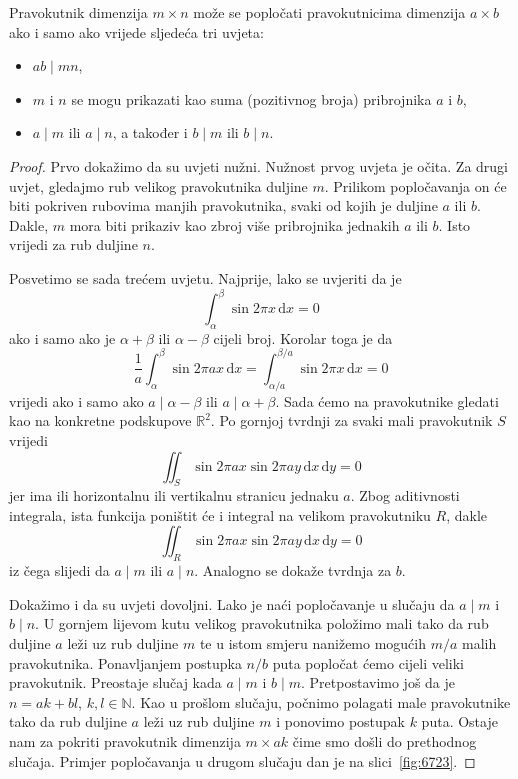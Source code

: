 \documentclass[11pt]{scrartcl}
\newcommand{\D}{\,\mathrm d}
\begin{document}
\begin{teorem} \label{2:teorem}
Pravokutnik dimenzija $m \times n$ može se popločati pravokutnicima dimenzija $a \times b$ ako i samo ako vrijede sljedeća tri uvjeta:
\begin{itemize}
\item $ab \mid mn$,
\item $m$ i $n$ se mogu prikazati kao suma (pozitivnog broja) pribrojnika $a$ i $b$,
\item $a \mid m$ ili $a \mid n$, a također i $b \mid m$ ili $b \mid n$.
\end{itemize}
\end{teorem}

\begin{proof}
Prvo dokažimo da su uvjeti nužni. Nužnost prvog uvjeta je očita. Za drugi uvjet, gledajmo rub velikog pravokutnika duljine $m$. Prilikom popločavanja on će biti pokriven rubovima manjih pravokutnika, svaki od kojih je duljine $a$ ili $b$. Dakle, $m$ mora biti prikaziv kao zbroj više pribrojnika jednakih $a$ ili $b$. Isto vrijedi za rub duljine $n$.

Posvetimo se sada trećem uvjetu. Najprije, lako se uvjeriti da je
\[
\int _\alpha ^\beta \sin 2 \pi x \D x= 0
\]
ako i samo ako je $\alpha + \beta$ ili $\alpha - \beta$ cijeli broj. Korolar toga je da
\[
\frac 1a \int _\alpha ^\beta \sin 2 \pi a x \D x = \int _{\alpha/a}^{\beta/a} \sin 2 \pi x \D x = 0
\]
vrijedi ako i samo ako $a \mid \alpha - \beta$ ili $a \mid \alpha + \beta$. Sada ćemo na pravokutnike gledati kao na konkretne podskupove $\mathbb{R}^2$. Po gornjoj tvrdnji za svaki mali pravokutnik $S$ vrijedi
\[
\iint _S \sin 2 \pi ax \sin 2 \pi ay \D x \D y = 0
\]
jer ima ili horizontalnu ili vertikalnu stranicu jednaku $a$. Zbog aditivnosti integrala, ista funkcija poništit će i integral na velikom pravokutniku $R$, dakle
\[
\iint _R \sin 2 \pi ax \sin 2 \pi ay \D x \D y = 0
\]
iz čega slijedi da $a \mid m$ ili $a \mid n$. Analogno se dokaže tvrdnja za $b$.

Dokažimo i da su uvjeti dovoljni. Lako je naći popločavanje u slučaju da $a \mid m$ i $b \mid n$. U gornjem lijevom kutu velikog pravokutnika položimo mali tako da rub duljine $a$ leži uz rub duljine $m$ te u istom smjeru nanižemo mogućih $m/a$ malih pravokutnika. Ponavljanjem postupka $n/b$ puta popločat ćemo cijeli veliki pravokutnik. Preostaje slučaj kada $a \mid m$ i $b \mid m$. Pretpostavimo još da je $n = ak + bl$, $k, l \in \mathbb{N}$. Kao u prošlom slučaju, počnimo polagati male pravokutnike tako da rub duljine $a$ leži uz rub duljine $m$ i ponovimo postupak $k$ puta. Ostaje nam za pokriti pravokutnik dimenzija $m \times ak$ čime smo došli do prethodnog slučaja. Primjer popločavanja u drugom slučaju dan je na slici~\ref{fig:6723}.
\end{proof}
\end{document}
